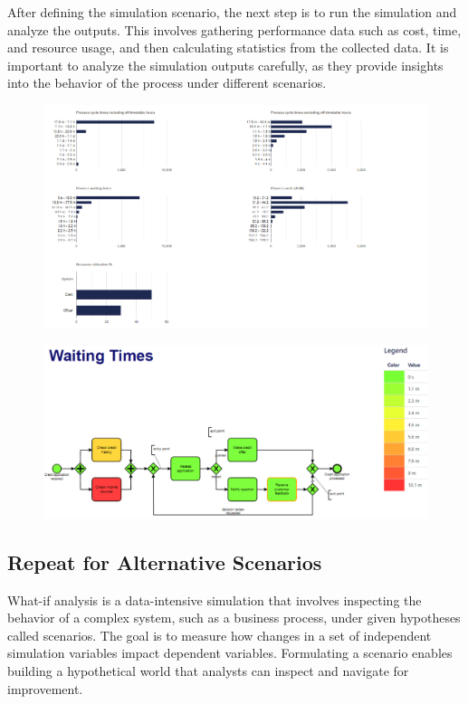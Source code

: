 After defining the simulation scenario, the next step is to run the simulation and analyze the outputs. This involves gathering performance data such as cost, time, and resource usage, and then calculating statistics from the collected data. It is important to analyze the simulation outputs carefully, as they provide insights into the behavior of the process under different scenarios.
\begin{figure}[h!]
    \centering
    \includegraphics[width=1\linewidth]{capitolo 10/7.png}
\end{figure}

\begin{figure}[h!]
    \centering
    \includegraphics[width=0.75\linewidth]{capitolo 10/8.png}
\end{figure}

\newpage
\subsection{Repeat for Alternative Scenarios}

What-if analysis is a data-intensive simulation that involves inspecting the behavior of a complex system, such as a business process, under given hypotheses called scenarios. The goal is to measure how changes in a set of independent simulation variables impact dependent variables. Formulating a scenario enables building a hypothetical world that analysts can inspect and navigate for improvement.

